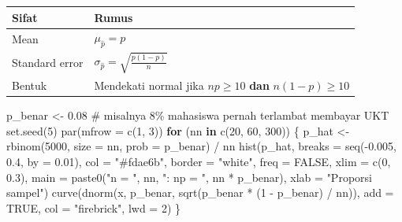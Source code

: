 \documentclass[
  indonesian,
  letterpaper,
]{book}
\newenvironment{Shaded}{\begin{snugshade}}{\end{snugshade}}
\newcommand{\AttributeTok}[1]{\textcolor[rgb]{0.40,0.45,0.13}{#1}}
\newcommand{\CommentTok}[1]{\textcolor[rgb]{0.37,0.37,0.37}{#1}}
\newcommand{\ConstantTok}[1]{\textcolor[rgb]{0.56,0.35,0.01}{#1}}
\newcommand{\ControlFlowTok}[1]{\textcolor[rgb]{0.00,0.23,0.31}{\textbf{#1}}}
\newcommand{\DecValTok}[1]{\textcolor[rgb]{0.68,0.00,0.00}{#1}}
\newcommand{\FloatTok}[1]{\textcolor[rgb]{0.68,0.00,0.00}{#1}}
\newcommand{\FunctionTok}[1]{\textcolor[rgb]{0.28,0.35,0.67}{#1}}
\newcommand{\NormalTok}[1]{\textcolor[rgb]{0.00,0.23,0.31}{#1}}
\newcommand{\OtherTok}[1]{\textcolor[rgb]{0.00,0.23,0.31}{#1}}
\newcommand{\SpecialCharTok}[1]{\textcolor[rgb]{0.37,0.37,0.37}{#1}}
\newcommand{\StringTok}[1]{\textcolor[rgb]{0.13,0.47,0.30}{#1}}
\newcounter{none} %
\begin{document}
{\def\LTcaptype{none} %
\begin{longtable}[]{@{}ll@{}}
\toprule\noalign{}
Sifat & Rumus \\
\midrule\noalign{}
\endhead
\bottomrule\noalign{}
\endlastfoot
Mean & \(\mu_{\hat{p}} = p\) \\
Standard error & \(\sigma_{\hat{p}} = \sqrt{\frac{p(1 - p)}{n}}\) \\
Bentuk & Mendekati normal jika \(np \ge 10\) \textbf{dan}
\(n(1 - p) \ge 10\) \\
\end{longtable}
}

\begin{Shaded}
\begin{Highlighting}[]
\NormalTok{p\_benar }\OtherTok{\textless{}{-}} \FloatTok{0.08} \CommentTok{\# misalnya 8\% mahasiswa pernah terlambat membayar UKT}
\FunctionTok{set.seed}\NormalTok{(}\DecValTok{5}\NormalTok{)}
\FunctionTok{par}\NormalTok{(}\AttributeTok{mfrow =} \FunctionTok{c}\NormalTok{(}\DecValTok{1}\NormalTok{, }\DecValTok{3}\NormalTok{))}
\ControlFlowTok{for}\NormalTok{ (nn }\ControlFlowTok{in} \FunctionTok{c}\NormalTok{(}\DecValTok{20}\NormalTok{, }\DecValTok{60}\NormalTok{, }\DecValTok{300}\NormalTok{)) \{}
\NormalTok{p\_hat }\OtherTok{\textless{}{-}} \FunctionTok{rbinom}\NormalTok{(}\DecValTok{5000}\NormalTok{, }\AttributeTok{size =}\NormalTok{ nn, }\AttributeTok{prob =}\NormalTok{ p\_benar) }\SpecialCharTok{/}\NormalTok{ nn}
\FunctionTok{hist}\NormalTok{(p\_hat, }\AttributeTok{breaks =} \FunctionTok{seq}\NormalTok{(}\SpecialCharTok{{-}}\FloatTok{0.005}\NormalTok{, }\FloatTok{0.4}\NormalTok{, }\AttributeTok{by =} \FloatTok{0.01}\NormalTok{), }\AttributeTok{col =} \StringTok{"\#fdae6b"}\NormalTok{, }\AttributeTok{border =} \StringTok{"white"}\NormalTok{,}
\AttributeTok{freq =} \ConstantTok{FALSE}\NormalTok{, }\AttributeTok{xlim =} \FunctionTok{c}\NormalTok{(}\DecValTok{0}\NormalTok{, }\FloatTok{0.3}\NormalTok{),}
\AttributeTok{main =} \FunctionTok{paste0}\NormalTok{(}\StringTok{"n = "}\NormalTok{, nn, }\StringTok{": np = "}\NormalTok{, nn }\SpecialCharTok{*}\NormalTok{ p\_benar), }\AttributeTok{xlab =} \StringTok{"Proporsi sampel"}\NormalTok{)}
\FunctionTok{curve}\NormalTok{(}\FunctionTok{dnorm}\NormalTok{(x, p\_benar, }\FunctionTok{sqrt}\NormalTok{(p\_benar }\SpecialCharTok{*}\NormalTok{ (}\DecValTok{1} \SpecialCharTok{{-}}\NormalTok{ p\_benar) }\SpecialCharTok{/}\NormalTok{ nn)), }\AttributeTok{add =} \ConstantTok{TRUE}\NormalTok{,}
\AttributeTok{col =} \StringTok{"firebrick"}\NormalTok{, }\AttributeTok{lwd =} \DecValTok{2}\NormalTok{)}
\NormalTok{\}}
\end{Highlighting}
\end{Shaded}
\end{document}
